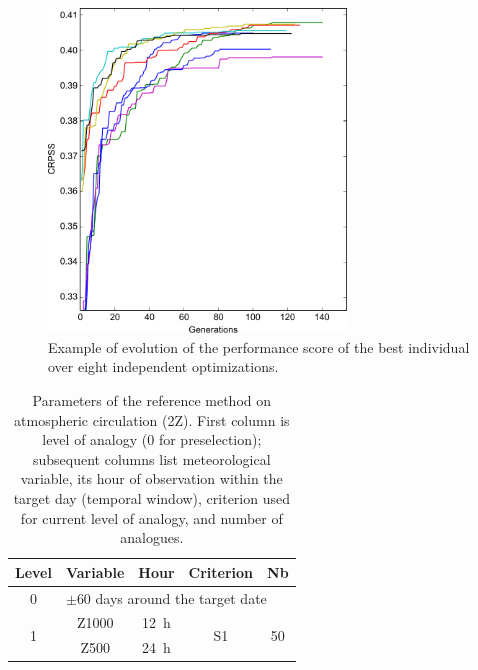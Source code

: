 \documentclass[review]{elsarticle}
\providecommand{\DIFaddbeginFL}{} %
\providecommand{\DIFaddendFL}{} %
\providecommand{\DIFdelbeginFL}{} %
\providecommand{\DIFdelendFL}{} %
\begin{document}
\begin{figure}[t]
	\DIFdelbeginFL %
\DIFdelendFL \DIFaddbeginFL \centerline{\includegraphics[width=7.9cm]{fig11.pdf}}
	\DIFaddendFL \caption{Example of evolution of the performance score of the best individual over eight independent optimizations.}
	\label{fig:evolution}
\end{figure}

\clearpage


\begin{table}[t]
	\caption{Parameters of the reference method on atmospheric circulation (2Z). First column is level of analogy (0 for preselection); subsequent columns list meteorological variable, its hour of observation within the target day (temporal window), criterion used for current level of analogy, and number of analogues.}
	\footnotesize
	\begin{center}
		\begin{tabular}{ccccc}
			\hline
			Level & Variable & Hour & Criterion & Nb \\ 
			\hline 
			0 & \multicolumn{4}{l}{$\pm 60$ days around the target date} \\
			\hline 
			\multirow{2}{*}{1} & Z1000 & 12~h & \multirow{2}{*}{S1} & \multirow{2}{*}{50} \\
			& Z500 & 24~h & & \\ 
			\hline 
		\end{tabular} 
	\end{center}
	\label{table:params_R1}
\end{table}
\end{document}
